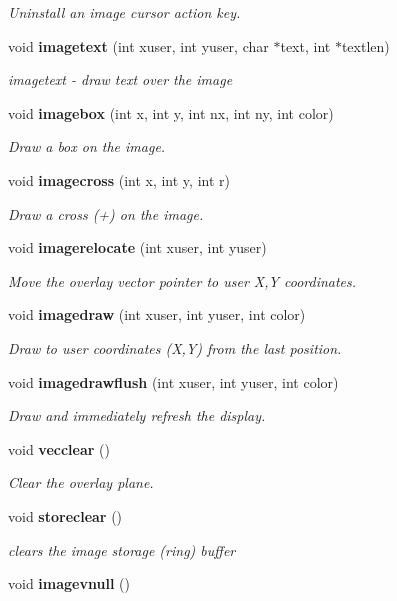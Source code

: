 \begin{CompactItemize}
\begin{CompactList}\small\item\em Uninstall an image cursor action key. \item\end{CompactList}\item 
void {\bf imagetext} (int xuser, int yuser, char $\ast$text, int $\ast$textlen)
\begin{CompactList}\small\item\em imagetext - draw text over the image \item\end{CompactList}\item 
void {\bf imagebox} (int x, int y, int nx, int ny, int color)
\begin{CompactList}\small\item\em Draw a box on the image. \item\end{CompactList}\item 
void {\bf imagecross} (int x, int y, int r)
\begin{CompactList}\small\item\em Draw a cross (+) on the image. \item\end{CompactList}\item 
void {\bf imagerelocate} (int xuser, int yuser)
\begin{CompactList}\small\item\em Move the overlay vector pointer to user X,Y coordinates. \item\end{CompactList}\item 
void {\bf imagedraw} (int xuser, int yuser, int color)
\begin{CompactList}\small\item\em Draw to user coordinates (X,Y) from the last position. \item\end{CompactList}\item 
void {\bf imagedrawflush} (int xuser, int yuser, int color)
\begin{CompactList}\small\item\em Draw and immediately refresh the display. \item\end{CompactList}\item 
void {\bf vecclear} ()
\begin{CompactList}\small\item\em Clear the overlay plane. \item\end{CompactList}\item 
void {\bf storeclear} ()
\begin{CompactList}\small\item\em clears the image storage (ring) buffer \item\end{CompactList}\item 
void {\bf imagevnull} ()\label{xtvutils_8c_a183}


\end{CompactItemize}
